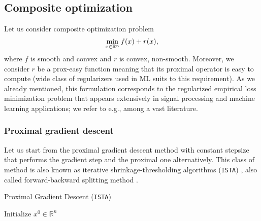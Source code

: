 \subsection{Composite optimization}\label{sec:basics_composite}
Let us consider composite optimization problem
\begin{equation}\label{eq:pb_composite}
\min_{x\in\mathbb{R}^n} f(x) + r(x),
\end{equation}
where $f$ is smooth and convex and $r$ is convex, non-smooth. Moreover, we consider $r$ be a prox-easy function meaning that its proximal operator is easy to compute (wide class of regularizers used in ML suits to this requirement). As we already mentioned, this formulation corresponds to the regularized empirical loss minimization problem that appears extensively in signal processing and machine learning applications; we refer to e.g.\;\cite{candes2008enhancing,combettes2011proximal,bach2012optimization}, among a vast literature.



\subsubsection{Proximal gradient descent}
Let us start from the proximal gradient descent method with constant stepsize that performs the gradient step and the proximal one alternatively. This class of method is also known as iterative shrinkage-thresholding algorithms (\texttt{ISTA}) \cite{daubechies2004iterative}, also called forward-backward splitting method \cite{gabay1983chapter, combettes2011proximal, raguet2013generalized}.

\begin{algorithm}
    \caption{Proximal Gradient Descent (\texttt{ISTA})}
    \label{algo:pgd}
    \begin{algorithmic}
        \STATE Initialize $x^0\in\mathbb{R}^n$
        \ENDFOR
    \end{algorithmic}
\end{algorithm}

